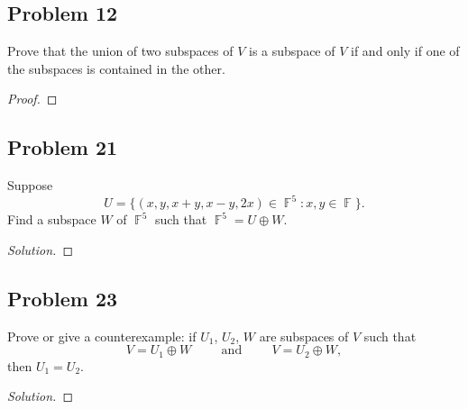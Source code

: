 \documentclass[letterpaper, 12pt]{amsart}
\DeclareMathOperator{\F}{\mathbb{F}}
\theoremstyle{definition}  %
\begin{document}
		\subsection*{Problem 12}
		Prove that the union of two subspaces of $V$ is a subspace of $V$ if and only if one of the subspaces is contained in the other.

		\begin{proof}
		\end{proof}		

		\subsection*{Problem 21}
		Suppose $$U = \{ (x,y,x+y,x-y,2x) \in \F^{5} : x, y \in \F \}.$$ 
		Find a subspace $W$ of $\F^{5}$ such that $\F^{5} = U \oplus W$.

		\begin{proof}[Solution]
		\end{proof}

		\subsection*{Problem 23}
		Prove or give a counterexample: if $U_{1}$, $U_{2}$, $W$ are subspaces of $V$ such that	$$V = U_{1} \oplus W \hspace{1cm} \text{and} \hspace{1cm} V = U_{2} \oplus W,$$ then $U_{1} = U_{2}$. 

		\begin{proof}[Solution]
		\end{proof}
\end{document}

